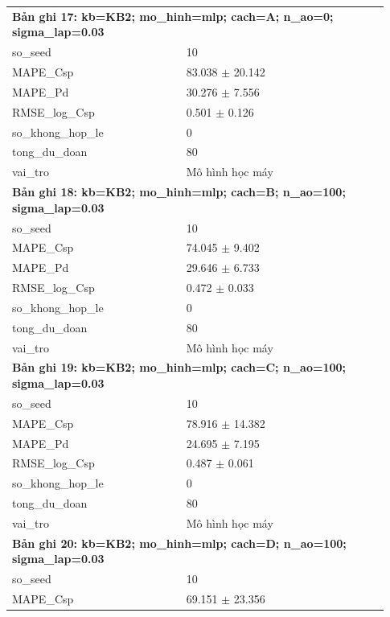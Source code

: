 \begin{longtable}{p{0.43\linewidth}p{0.50\linewidth}}
\midrule
\multicolumn{2}{p{0.95\linewidth}}{\textbf{Bản ghi 17: kb=KB2; mo\_hinh=mlp; cach=A; n\_ao=0; sigma\_lap=0.03}} \\
so\_\allowbreak seed & 10 \\
MAPE\_\allowbreak Csp & 83.038 $\pm$ 20.142 \\
MAPE\_\allowbreak Pd & 30.276 $\pm$ 7.556 \\
RMSE\_\allowbreak log\_\allowbreak Csp & 0.501 $\pm$ 0.126 \\
so\_\allowbreak khong\_\allowbreak hop\_\allowbreak le & 0 \\
tong\_\allowbreak du\_\allowbreak doan & 80 \\
vai\_\allowbreak tro & Mô hình học máy \\
\midrule
\multicolumn{2}{p{0.95\linewidth}}{\textbf{Bản ghi 18: kb=KB2; mo\_hinh=mlp; cach=B; n\_ao=100; sigma\_lap=0.03}} \\
so\_\allowbreak seed & 10 \\
MAPE\_\allowbreak Csp & 74.045 $\pm$ 9.402 \\
MAPE\_\allowbreak Pd & 29.646 $\pm$ 6.733 \\
RMSE\_\allowbreak log\_\allowbreak Csp & 0.472 $\pm$ 0.033 \\
so\_\allowbreak khong\_\allowbreak hop\_\allowbreak le & 0 \\
tong\_\allowbreak du\_\allowbreak doan & 80 \\
vai\_\allowbreak tro & Mô hình học máy \\
\midrule
\multicolumn{2}{p{0.95\linewidth}}{\textbf{Bản ghi 19: kb=KB2; mo\_hinh=mlp; cach=C; n\_ao=100; sigma\_lap=0.03}} \\
so\_\allowbreak seed & 10 \\
MAPE\_\allowbreak Csp & 78.916 $\pm$ 14.382 \\
MAPE\_\allowbreak Pd & 24.695 $\pm$ 7.195 \\
RMSE\_\allowbreak log\_\allowbreak Csp & 0.487 $\pm$ 0.061 \\
so\_\allowbreak khong\_\allowbreak hop\_\allowbreak le & 0 \\
tong\_\allowbreak du\_\allowbreak doan & 80 \\
vai\_\allowbreak tro & Mô hình học máy \\
\midrule
\multicolumn{2}{p{0.95\linewidth}}{\textbf{Bản ghi 20: kb=KB2; mo\_hinh=mlp; cach=D; n\_ao=100; sigma\_lap=0.03}} \\
so\_\allowbreak seed & 10 \\
MAPE\_\allowbreak Csp & 69.151 $\pm$ 23.356 \\

\end{longtable}
